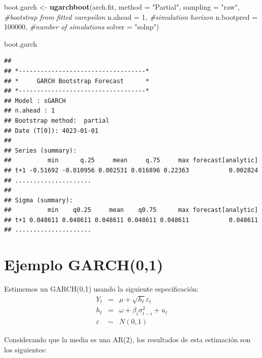 \documentclass[
]{book}
\newenvironment{Shaded}{\begin{snugshade}}{\end{snugshade}}
\newcommand{\AttributeTok}[1]{\textcolor[rgb]{0.13,0.29,0.53}{#1}}
\newcommand{\CommentTok}[1]{\textcolor[rgb]{0.56,0.35,0.01}{\textit{#1}}}
\newcommand{\DecValTok}[1]{\textcolor[rgb]{0.00,0.00,0.81}{#1}}
\newcommand{\FunctionTok}[1]{\textcolor[rgb]{0.13,0.29,0.53}{\textbf{#1}}}
\newcommand{\NormalTok}[1]{#1}
\newcommand{\OtherTok}[1]{\textcolor[rgb]{0.56,0.35,0.01}{#1}}
\newcommand{\StringTok}[1]{\textcolor[rgb]{0.31,0.60,0.02}{#1}}
\begin{document}
\begin{Shaded}
\begin{Highlighting}[]
\NormalTok{boot.garch }\OtherTok{\textless{}{-}} \FunctionTok{ugarchboot}\NormalTok{(arch.fit,}
                         \AttributeTok{method =} \StringTok{"Partial"}\NormalTok{,}
                         \AttributeTok{sampling =} \StringTok{"raw"}\NormalTok{,  }\CommentTok{\#bootstrap from fitted varepsilon}
                         \AttributeTok{n.ahead =} \DecValTok{1}\NormalTok{,          }\CommentTok{\#simulation horizon}
                         \AttributeTok{n.bootpred =} \DecValTok{100000}\NormalTok{, }\CommentTok{\#number of simulations }
                         \AttributeTok{solver =} \StringTok{"solnp"}\NormalTok{)}

\NormalTok{boot.garch}
\end{Highlighting}
\end{Shaded}

\begin{verbatim}
## 
## *-----------------------------------*
## *     GARCH Bootstrap Forecast      *
## *-----------------------------------*
## Model : sGARCH
## n.ahead : 1
## Bootstrap method:  partial
## Date (T[0]): 4023-01-01
## 
## Series (summary):
##          min      q.25     mean     q.75     max forecast[analytic]
## t+1 -0.51692 -0.010956 0.002531 0.016896 0.22363           0.002824
## .....................
## 
## Sigma (summary):
##          min    q0.25     mean    q0.75      max forecast[analytic]
## t+1 0.048611 0.048611 0.048611 0.048611 0.048611           0.048611
## .....................
\end{verbatim}

\hypertarget{ejemplo-garch01}{%
\section{Ejemplo GARCH(0,1)}\label{ejemplo-garch01}}

Estimemos un GARCH(0,1) usando la siguiente especificación:
\begin{eqnarray*}
Y_t & = & \mu+\sqrt{h_t}\varepsilon_t \\
    h_t & = & \omega+\beta_i \sigma^2_{t-i}+u_t \\
    \varepsilon & \sim & N(0,1) 
\end{eqnarray*}

Considerando que la media es una AR(2), los resultados de esta estimación son los siguientes:
\end{document}
